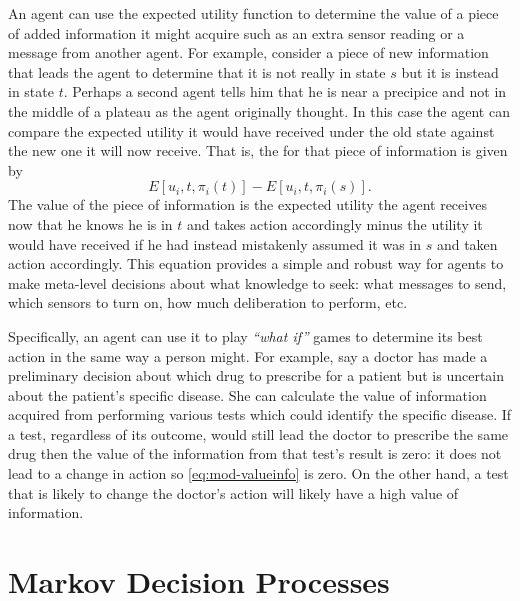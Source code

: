 An agent can use the expected utility function to determine the value
of a piece of added information it might acquire such as an extra
sensor reading or a message from another agent. For example, consider
a piece of new information that leads the agent to determine that it
is not really in state $s$ but it is instead in state $t$. Perhaps a
second agent tells him that he is near a precipice and not in the
middle of a plateau as the agent originally thought. In this case the
agent can compare the expected utility it would have received under
the old state against the new one it will now receive. That is, the
 for that piece of information is given by
\begin{equation}
  \label{eq:mod-valueinfo}
  E[u_i,t,\pi_i(t)] -  E[u_i,t,\pi_i(s)].
\end{equation}
The value of the piece of information is the expected utility the
agent receives now that he knows he is in $t$ and takes action
accordingly minus the utility it would have received if he had instead
mistakenly assumed it was in $s$ and taken action accordingly. This
equation provides a simple and robust way for agents to make
meta-level decisions about what knowledge to seek: what messages to
send, which sensors to turn on, how much deliberation to perform, etc.

Specifically, an agent can use it to play \emph{``what if''} games to
determine its best action in the same way a person might. For example,
say a doctor has made a preliminary decision about which drug to
prescribe for a patient but is uncertain about the patient's specific
disease. She can calculate the value of information acquired from
performing various tests which could identify the specific disease. If
a test, regardless of its outcome, would still lead the doctor to
prescribe the same drug then the value of the information from that
test's result is zero: it does not lead to a change in action so
\eqref{eq:mod-valueinfo} is zero. On the other hand, a test that is
likely to change the doctor's action will likely have a high value of
information.


\section{Markov Decision Processes}
\label{sec:mark-decis-proc}


